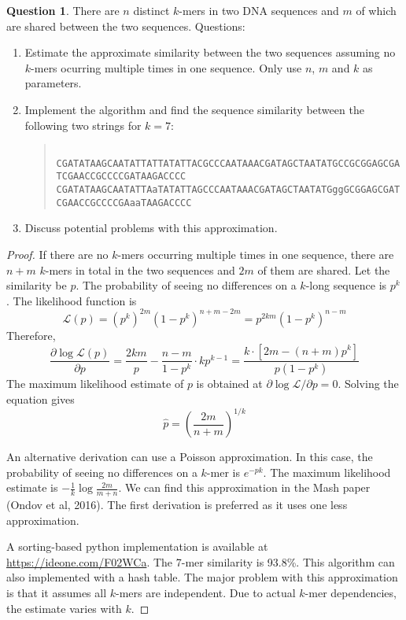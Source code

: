 \documentclass{article}[10pt]
\theoremstyle{definition}\newtheorem{question}{Question}
\begin{document}
\begin{question}
There are $n$ distinct $k$-mers in two DNA sequences and $m$ of which are
shared between the two sequences. Questions:
\begin{enumerate}
\item Estimate the approximate similarity between the two sequences assuming no
$k$-mers ocurring multiple times in one sequence. Only use $n$, $m$ and $k$ as
parameters.
\item Implement the algorithm and find the sequence similarity between the following two strings for $k=7$:
\begin{quote}
\footnotesize\tt
CGATATAAGCAATATTATTATATTACGCCCAATAAACGATAGCTAATATGCCGCGGAGCGATCGAACCGCCCCGATAAGACCCC\\
CGATATAAGCAATATTAaTATATTAGCCCAATAAACGATAGCTAATATGggGCGGAGCGATCGAACCGCCCCGAaaTAAGACCCC
\end{quote}
\item Discuss potential problems with this approximation.
\end{enumerate}
\end{question}

\begin{proof}
If there are no $k$-mers occurring multiple times in one sequence, there are
$n+m$ $k$-mers in total in the two sequences and $2m$ of them are shared.
Let the similarity be $p$. The probability of seeing no differences on a
$k$-long sequence is $p^k$. The likelihood function is
$$
\mathcal{L}(p)=\left(p^k\right)^{2m}\left(1-p^k\right)^{n+m-2m}=p^{2km}\left(1-p^k\right)^{n-m}
$$
Therefore,
$$
\frac{\partial\log\mathcal{L}(p)}{\partial p}=\frac{2km}{p}-\frac{n-m}{1-p^k}\cdot kp^{k-1}=\frac{k\cdot\left[2m-(n+m)p^k\right]}{p\left(1-p^k\right)}
$$
The maximum likelihood estimate of $p$ is obtained at
$\partial\log\mathcal{L}/\partial p=0$. Solving the equation gives
$$
\hat{p}=\left(\frac{2m}{n+m}\right)^{1/k}
$$

An alternative derivation can use a Poisson approximation. In this case, the
probability of seeing no differences on a $k$-mer is $e^{-pk}$. The maximum
likelihood estimate is $-\frac{1}{k}\log\frac{2m}{m+n}$. We can find this
approximation in the Mash paper (Ondov et al, 2016). The first derivation is
preferred as it uses one less approximation.

A sorting-based python implementation is available at
\href{https://ideone.com/F02WCa}{https://ideone.com/F02WCa}. The 7-mer
similarity is 93.8\%. This algorithm can also implemented with a hash table.
The major problem with this approximation is that it assumes all $k$-mers are
independent. Due to actual $k$-mer dependencies, the estimate varies with $k$.
\end{proof}
\end{document}
